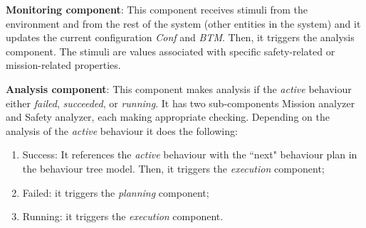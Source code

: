 \documentclass[journal]{IEEEtran}
\theoremstyle{definition}
\begin{document}
\textbf{Monitoring component}: This component receives stimuli from the environment and from the rest of the system (other entities in the system) and it updates the current configuration \textit{Conf} and \textit{BTM}. Then, it triggers the analysis component.
The stimuli are values associated with specific safety-related or mission-related properties. 





\textbf{Analysis component}: This component makes analysis if 
the \textit{active} behaviour either \textit{failed}, \textit{succeeded}, or \textit{running}. It has two sub-components Mission analyzer and Safety analyzer, each making appropriate checking.
Depending on the analysis of the \textit{active} behaviour it does the following:
\begin{enumerate}
\item  Success: 
It references the \textit{active} behaviour with the ``next" behaviour plan in the behaviour tree model. Then, it triggers the \textit{execution} component;
\item Failed:  it triggers the \textit{planning} component;
\item Running: it triggers the \textit{execution} component.
\end{enumerate}
 
\end{document}
